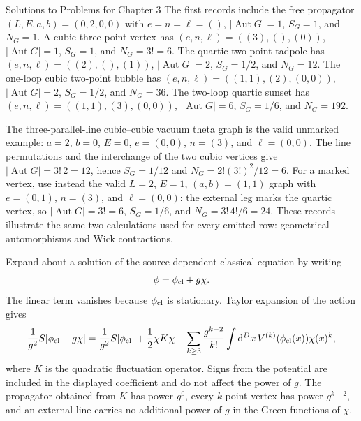 \begin{bankssolutions}{Solutions to Problems for Chapter 3}
The first records include the free propagator
$(L,E,a,b)=(0,2,0,0)$ with $e=n=\ell=()$, $|\operatorname{Aut}G|=1$,
$S_G=1$, and $N_G=1$.  A cubic three-point vertex has
$(e,n,\ell)=( (3),(),(0) )$, $|\operatorname{Aut}G|=1$, $S_G=1$, and
$N_G=3!=6$.  The quartic two-point tadpole has
$(e,n,\ell)=((2),(),(1))$, $|\operatorname{Aut}G|=2$, $S_G=1/2$, and
$N_G=12$.  The one-loop cubic two-point bubble has
$(e,n,\ell)=((1,1),(2),(0,0))$, $|\operatorname{Aut}G|=2$, $S_G=1/2$,
and $N_G=36$.  The two-loop quartic sunset has
$(e,n,\ell)=((1,1),(3),(0,0))$, $|\operatorname{Aut}G|=6$, $S_G=1/6$,
and $N_G=192$.

The three-parallel-line cubic--cubic vacuum theta graph is the valid
unmarked example: $a=2$, $b=0$, $E=0$, $e=(0,0)$, $n=(3)$, and
$\ell=(0,0)$.  The line permutations and the interchange of the two cubic
vertices give $|\operatorname{Aut}G|=3!\,2=12$, hence $S_G=1/12$ and
$N_G=2!(3!)^2/12=6$.  For a marked vertex, use instead the valid
$L=2$, $E=1$, $(a,b)=(1,1)$ graph with
$e=(0,1)$, $n=(3)$, and $\ell=(0,0)$: the external leg marks the quartic
vertex, so $|\operatorname{Aut}G|=3!=6$, $S_G=1/6$, and
$N_G=3!\,4!/6=24$.  These records illustrate the same two calculations used
for every emitted row: geometrical automorphisms and Wick contractions.

Expand about a solution of the source-dependent classical equation by writing
\begin{equation*}
 \phi=\phi_{\rm cl}+g\chi.
\end{equation*}
The linear term vanishes because $\phi_{\rm cl}$ is stationary.  Taylor
expansion of the action gives
\begin{equation*}
 \frac1{g^2}S[\phi_{\rm cl}+g\chi]
 =\frac1{g^2}S[\phi_{\rm cl}]
 +\frac12\chi K\chi
 -\sum_{k\ge3}\frac{g^{k-2}}{k!}
 \int\mathop{}\!\mathrm{d}^D x\,V^{(k)}(\phi_{\rm cl}(x))\chi(x)^k,
\end{equation*}
where $K$ is the quadratic fluctuation operator.  Signs from the potential
are included in the displayed coefficient and do not affect the power of $g$.
The propagator obtained from $K$ has power $g^0$, every $k$-point vertex has
power $g^{k-2}$, and an external line carries no additional power of $g$ in
the Green functions of $\chi$.


\end{bankssolutions}
